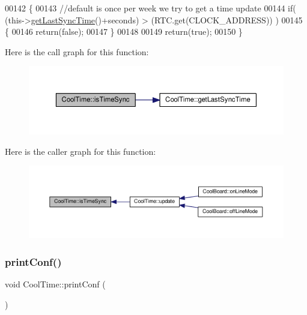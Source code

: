 \begin{DoxyCode}
00142 \{
00143 \textcolor{comment}{//default is once per week we try to get a time update}
00144     \textcolor{keywordflow}{if}( (this->\hyperlink{class_cool_time_a5d17f707a9d337720493b2bce9d41c21}{getLastSyncTime}()+seconds) > (RTC.get(CLOCK\_ADDRESS)) ) 
00145     \{
00146         \textcolor{keywordflow}{return}(\textcolor{keyword}{false});  
00147     \}
00148 
00149     \textcolor{keywordflow}{return}(\textcolor{keyword}{true});
00150 \}
\end{DoxyCode}
Here is the call graph for this function\+:
\nopagebreak
\begin{figure}[H]
\begin{center}
\leavevmode
\includegraphics[width=350pt]{class_cool_time_a5ae038a4498602b189f76a10bf02adf8_cgraph}
\end{center}
\end{figure}
Here is the caller graph for this function\+:
\nopagebreak
\begin{figure}[H]
\begin{center}
\leavevmode
\includegraphics[width=350pt]{class_cool_time_a5ae038a4498602b189f76a10bf02adf8_icgraph}
\end{center}
\end{figure}
\mbox{\label{class_cool_time_af355e7f9b3898211cd2ff25eab5933b1}} 
\subsubsection{\texorpdfstring{print\+Conf()}{printConf()}}
{\footnotesize\ttfamily void Cool\+Time\+::print\+Conf (\begin{DoxyParamCaption}{ }\end{DoxyParamCaption})}

